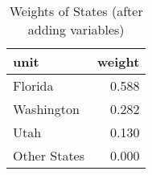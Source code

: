 \begin{table}[!h]

\caption{Weights of States (after adding variables)}
\centering
\begin{tabular}[t]{l|r}
\hline
unit & weight\\
\hline
Florida & 0.588\\
\hline
Washington & 0.282\\
\hline
Utah & 0.130\\
\hline
Other States & 0.000\\
\hline
\end{tabular}
\end{table}
    